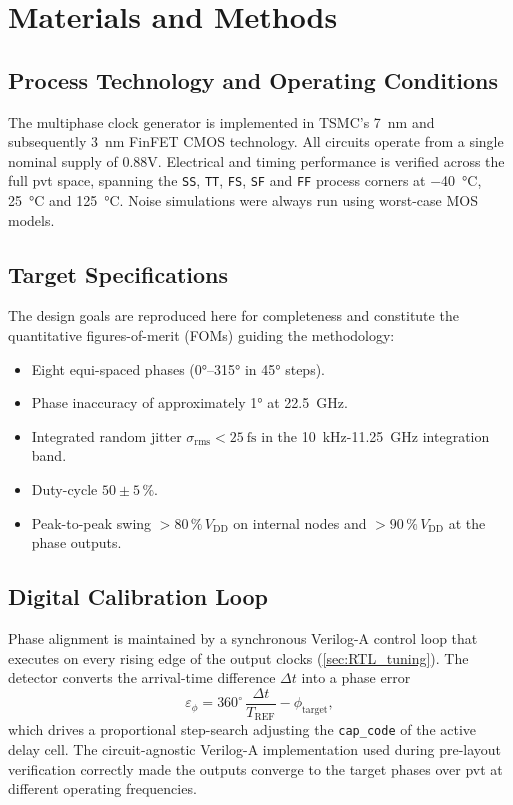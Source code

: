 \section{Materials and Methods}\label{sec:mat_methods}

\subsection{Process Technology and Operating Conditions}
The multiphase clock generator is implemented in TSMC's \SI{7}{\nano\metre} and subsequently \SI{3}{\nano\metre} FinFET CMOS technology.
All circuits operate from a single nominal supply of 0.88V.
Electrical and timing performance is verified across the full \gls{pvt} space, spanning the \texttt{SS}, \texttt{TT}, \texttt{FS}, \texttt{SF} and \texttt{FF} process corners at \SI{-40}{\celsius}, \SI{25}{\celsius} and \SI{125}{\celsius}. 
Noise simulations were always run using worst-case MOS models.

\subsection{Target Specifications}
The design goals are reproduced here for completeness and constitute the quantitative figures-of-merit (FOMs) guiding the methodology:
\begin{itemize}
  \item Eight equi-spaced phases (0°--315° in 45° steps).
  \item Phase inaccuracy of approximately \ang{1} at \SI{22.5}{\giga\hertz}.
  \item Integrated random jitter $\sigma_\mathrm{rms}<\SI{25}{\femto\second}$ in the \SI{10}{\kilo\hertz}\--\SI{11.25}{\giga\hertz} integration band.
  \item Duty-cycle $50\pm5\,\%$.
  \item Peak-to-peak swing $>80\,\%\,V_\mathrm{DD}$ on internal nodes and $>90\,\%\,V_\mathrm{DD}$ at the phase outputs.
\end{itemize}

\subsection{Digital Calibration Loop}\label{sec:methods_digital_loop}
Phase alignment is maintained by a synchronous Verilog-A control loop that executes on every rising edge of the output clocks (\ref{sec:RTL_tuning}). 
The detector converts the arrival-time difference $\Delta t$ into a phase error 
\[
\varepsilon_\phi = 360^{\circ}\,\frac{\Delta t}{T_\mathrm{REF}} - \phi_\mathrm{target},
\]
which drives a proportional step-search adjusting the \texttt{cap\_code} of the active delay cell. 
The circuit-agnostic Verilog-A implementation used during pre-layout verification correctly made the outputs converge to the target phases over \gls{pvt} at different operating frequencies.

